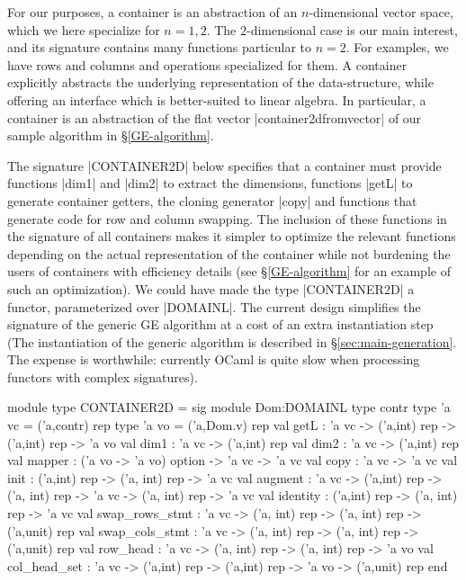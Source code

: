 \documentclass{elsart}
\begin{document}
For our purposes, a container is an abstraction of an $n$-dimensional
vector space, which we here specialize for $n=1,2$.  The
$2$-dimensional case is our main interest, and its signature contains
many functions particular to $n=2$.  For examples, we have rows and
columns and operations specialized for them.  A container explicitly
abstracts the underlying representation of the data-structure, while
offering an interface which is better-suited to linear algebra. In
particular, a container is an abstraction of the flat vector
|container2dfromvector| of our sample algorithm in
\S\ref{GE-algorithm}.

The signature |CONTAINER2D| below specifies that a container must
provide functions |dim1| and |dim2| to extract the dimensions,
functions |getL| to generate container getters, the cloning generator
|copy| and functions that generate code for row and column
swapping. The inclusion of these functions in the signature of all
containers makes it simpler to optimize the relevant functions
depending on the actual representation of the container while not
burdening the users of containers with efficiency details (see
\S\ref{GE-algorithm} for an example of such an optimization).  We
could have made the type |CONTAINER2D| a functor, parameterized over
|DOMAINL|. The current design simplifies the signature of the generic
GE algorithm at a cost of an extra instantiation step (The
instantiation of the generic algorithm is described in
\S\ref{sec:main-generation}. The expense is worthwhile: currently
OCaml is quite slow when processing functors with complex signatures).
\begin{code}
module type CONTAINER2D = sig
  module Dom:DOMAINL
  type contr
  type 'a vc = ('a,contr) rep
  type 'a vo = ('a,Dom.v) rep
  val getL : 'a vc -> ('a,int) rep -> ('a,int) rep -> 'a vo
  val dim1 : 'a vc -> ('a,int) rep
  val dim2 : 'a vc -> ('a,int) rep
  val mapper : ('a vo -> 'a vo) option -> 'a vc -> 'a vc
  val copy : 'a vc -> 'a vc
  val init : ('a,int) rep -> ('a, int) rep -> 'a vc
  val augment : 'a vc -> ('a,int) rep -> ('a, int) rep -> 'a vc ->
                ('a, int) rep -> 'a vc
  val identity : ('a,int) rep -> ('a, int) rep -> 'a vc
  val swap_rows_stmt : 'a vc -> ('a, int) rep -> ('a, int) rep -> 
                       ('a,unit) rep
  val swap_cols_stmt : 'a vc -> ('a, int) rep -> ('a, int) rep -> 
                       ('a,unit) rep
  val row_head : 'a vc -> ('a, int) rep -> ('a, int) rep -> 'a vo
  val col_head_set : 'a vc -> ('a,int) rep -> ('a,int) rep -> 'a vo -> 
            ('a,unit) rep
end
\end{code}
\end{document}
